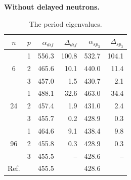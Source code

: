\documentclass[authoryear]{elsarticle}
\begin{document}
\textbf{Without delayed neutrons.}


\begin{table}[h]
\caption{The period eigenvalues.}
\label{tab:iaea_without_alpha}
\begin{center}
\begin{tabular}{c c r r r r}
\hline
$n$ & $p$ & $\alpha_{dif}$ & $\Delta_{dif}$ &$\alpha_{sp_3}$& $\Delta_{sp_3}$ \\
\hline
	& 1	& 556.3 & 100.8 & 532.7 & 104.1\\
6	& 2	& 465.6 & 10.1 & 440.0 & 11.4\\
	& 3	& 457.0 &  1.5 & 430.7 & 2.1\\ 
\hline
	& 1	& 488.1 & 32.6 & 463.0 & 34.4\\
24& 2	& 457.4 & 1.9 & 431.0 & 2.4\\
	& 3	& 455.7 & 0.2 & 428.9 & 0.3\\ 
\hline
	& 1	& 464.6 & 9.1 & 438.4 & 9.8\\
96& 2	& 455.8 & 0.3 & 428.9 & 0.3\\
	& 3	& 455.5 & -- & 428.6 & -- \\ 
\hline
Ref.& & 455.5 & & 428.6 \\ 
\hline
\end{tabular}
\end{center}
\end{table}
\end{document}
